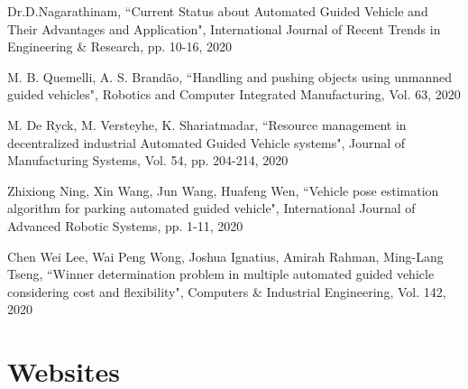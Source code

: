 \begin{thebibliography}{}
 Dr.D.Nagarathinam, ``Current Status about Automated Guided Vehicle and Their Advantages and Application", International Journal of Recent Trends in Engineering \& Research, pp. 10-16, 2020

 M. B. Quemelli, A. S. Brand\~{a}o, ``Handling and pushing objects using unmanned guided vehicles", Robotics and Computer Integrated Manufacturing, Vol. 63, 2020

 M. De Ryck, M. Versteyhe, K. Shariatmadar,  ``Resource management in decentralized industrial Automated Guided Vehicle systems", Journal of Manufacturing Systems, Vol. 54, pp. 204-214, 2020

 Zhixiong Ning, Xin Wang, Jun Wang, Huafeng Wen, ``Vehicle pose estimation algorithm for parking automated guided vehicle", International Journal of Advanced Robotic Systems, pp. 1-11, 2020

 Chen Wei Lee, Wai Peng Wong, Joshua Ignatius, Amirah Rahman, Ming-Lang Tseng, ``Winner determination problem in multiple automated guided vehicle considering cost and flexibility", Computers \& Industrial Engineering, Vol. 142, 2020

\end{thebibliography}

\newpage


\chapter*{Websites}


